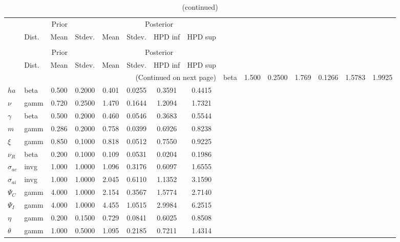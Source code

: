  
\begin{center}
\begin{longtable}{llcccccc} 
\caption{Results from Metropolis-Hastings (parameters)}
 \label{Table:MHPosterior:1}\\
\toprule 
  & \multicolumn{3}{c}{Prior}  &  \multicolumn{4}{c}{Posterior} \\
  \cmidrule(r{.75em}){2-4} \cmidrule(r{.75em}){5-8}
  & Dist. & Mean  & Stdev. & Mean & Stdev. & HPD inf & HPD sup\\
\midrule \endfirsthead 
\caption{(continued)}\\\toprule 
  & \multicolumn{3}{c}{Prior}  &  \multicolumn{4}{c}{Posterior} \\
  \cmidrule(r{.75em}){2-4} \cmidrule(r{.75em}){5-8}
  & Dist. & Mean  & Stdev. & Mean & Stdev. & HPD inf & HPD sup\\
\midrule \endhead 
\bottomrule \multicolumn{8}{r}{(Continued on next page)} \endfoot 
\bottomrule \endlastfoot 
${\sigma}$ & beta &   1.500 & 0.2500 &   1.769& 0.1266 &  1.5783 &  1.9925 \\ 
${ha}$ & beta &   0.500 & 0.2000 &   0.401& 0.0255 &  0.3591 &  0.4415 \\ 
$\nu$ & gamm &   0.720 & 0.2500 &   1.470& 0.1644 &  1.2094 &  1.7321 \\ 
$\gamma$ & beta &   0.500 & 0.2000 &   0.460& 0.0546 &  0.3683 &  0.5544 \\ 
${m}$ & gamm &   0.286 & 0.2000 &   0.758& 0.0399 &  0.6926 &  0.8238 \\ 
$\xi$ & gamm &   0.850 & 0.1000 &   0.818& 0.0512 &  0.7550 &  0.9225 \\ 
${\nu_R}$ & beta &   0.200 & 0.1000 &   0.109& 0.0531 &  0.0204 &  0.1986 \\ 
${\sigma_{ac}}$ & invg &   1.000 & 1.0000 &   1.096& 0.3176 &  0.6097 &  1.6555 \\ 
${\sigma_{ai}}$ & invg &   1.000 & 1.0000 &   2.045& 0.6110 &  1.1352 &  3.1590 \\ 
${\Psi_C}$ & gamm &   4.000 & 1.0000 &   2.154& 0.3567 &  1.5774 &  2.7140 \\ 
${\Psi_I}$ & gamm &   4.000 & 1.0000 &   4.455& 1.0515 &  2.9984 &  6.2515 \\ 
${\eta}$ & gamm &   0.200 & 0.1500 &   0.729& 0.0841 &  0.6025 &  0.8508 \\ 
${\theta}$ & gamm &   1.000 & 0.5000 &   1.095& 0.2185 &  0.7211 &  1.4314 \\ 

\end{longtable}
\end{center}
